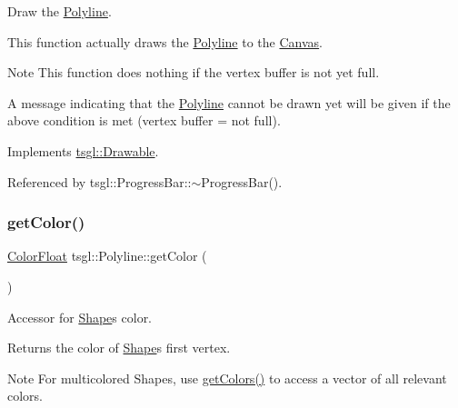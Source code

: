 Draw the \hyperlink{classtsgl_1_1_polyline}{Polyline}. 

This function actually draws the \hyperlink{classtsgl_1_1_polyline}{Polyline} to the \hyperlink{classtsgl_1_1_canvas}{Canvas}. \begin{DoxyNote}{Note}
This function does nothing if the vertex buffer is not yet full. 

A message indicating that the \hyperlink{classtsgl_1_1_polyline}{Polyline} cannot be drawn yet will be given if the above condition is met (vertex buffer = not full). 
\end{DoxyNote}


Implements \hyperlink{classtsgl_1_1_drawable}{tsgl\+::\+Drawable}.



Referenced by tsgl\+::\+Progress\+Bar\+::$\sim$\+Progress\+Bar().

\mbox{\label{classtsgl_1_1_polyline_ad0c19e65e6573ff85adf24c984968618}} 
\subsubsection{\texorpdfstring{get\+Color()}{getColor()}}
{\footnotesize\ttfamily \hyperlink{structtsgl_1_1_color_float}{Color\+Float} tsgl\+::\+Polyline\+::get\+Color (\begin{DoxyParamCaption}{ }\end{DoxyParamCaption})\hspace{0.3cm}{\ttfamily [virtual]}}



Accessor for \hyperlink{classtsgl_1_1_shape}{Shape}\textquotesingle{}s color. 

Returns the color of \hyperlink{classtsgl_1_1_shape}{Shape}\textquotesingle{}s first vertex. \begin{DoxyNote}{Note}
For multicolored Shapes, use \hyperlink{classtsgl_1_1_polyline_aea583be1dd5d812c1684c05c2372be83}{get\+Colors()} to access a vector of all relevant colors. 
\end{DoxyNote}
\mbox{\label{classtsgl_1_1_polyline_aea583be1dd5d812c1684c05c2372be83}} 
